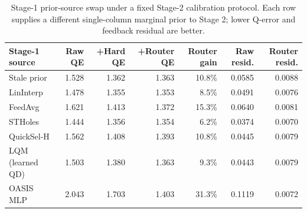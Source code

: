 \begin{table}[t]
  \centering
  \small
  \caption{Stage-1 prior-source swap under a fixed Stage-2 calibration protocol. Each row supplies a different single-column marginal prior to Stage 2; lower Q-error and feedback residual are better.}
  \label{tab:stage1_estimator_swap}
  \setlength{\tabcolsep}{4pt}
  \begin{tabular}{lrrrrrr}
    \toprule
    Stage-1 source & Raw QE & +Hard QE & +Router QE & Router gain & Raw resid. & Router resid. \\
    \midrule
    Stale prior & 1.528 & 1.362 & 1.363 & 10.8\% & 0.0585 & 0.0088 \\
    LinInterp & 1.478 & 1.355 & 1.353 & 8.5\% & 0.0491 & 0.0076 \\
    FeedAvg & 1.621 & 1.413 & 1.372 & 15.3\% & 0.0640 & 0.0081 \\
    STHoles & 1.444 & 1.356 & 1.354 & 6.2\% & 0.0374 & 0.0070 \\
    QuickSel-H & 1.562 & 1.408 & 1.393 & 10.8\% & 0.0445 & 0.0079 \\
    LQM (learned QD) & 1.503 & 1.380 & 1.363 & 9.3\% & 0.0443 & 0.0079 \\
    OASIS MLP & 2.043 & 1.703 & 1.403 & 31.3\% & 0.1119 & 0.0072 \\
    \bottomrule
  \end{tabular}
\end{table}
